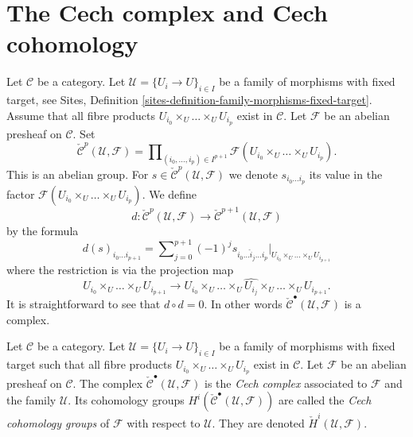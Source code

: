 \section{The Cech complex and Cech cohomology}
\label{section-cech}

\noindent
Let $\mathcal{C}$ be a category. Let $\mathcal{U} = \{U_i \to U\}_{i \in I}$
be a family of morphisms with fixed target, see
Sites, Definition \ref{sites-definition-family-morphisms-fixed-target}.
Assume that all fibre products $U_{i_0} \times_U \ldots \times_U U_{i_p}$
exist in $\mathcal{C}$. Let $\mathcal{F}$ be an abelian presheaf on
$\mathcal{C}$. Set
$$
\check{\mathcal{C}}^p(\mathcal{U}, \mathcal{F})
=
\prod\nolimits_{(i_0, \ldots, i_p) \in I^{p + 1}}
\mathcal{F}(U_{i_0} \times_U \ldots \times_U U_{i_p}).
$$
This is an abelian group. For
$s \in \check{\mathcal{C}}^p(\mathcal{U}, \mathcal{F})$ we denote
$s_{i_0\ldots i_p}$ its value in the factor
$\mathcal{F}(U_{i_0} \times_U \ldots \times_U U_{i_p})$.
We define
$$
d : \check{\mathcal{C}}^p(\mathcal{U}, \mathcal{F})
\longrightarrow
\check{\mathcal{C}}^{p + 1}(\mathcal{U}, \mathcal{F})
$$
by the formula
\begin{equation}
\label{equation-d-cech}
d(s)_{i_0\ldots i_{p + 1}} =
\sum\nolimits_{j = 0}^{p + 1}
(-1)^j s_{i_0\ldots \hat i_j \ldots i_p}
|_{U_{i_0} \times_U \ldots \times_U U_{i_{p + 1}}}
\end{equation}
where the restriction is via the projection map
$$
U_{i_0} \times_U \ldots \times_U U_{i_{p + 1}} \longrightarrow
U_{i_0} \times_U \ldots \times_U \widehat{U_{i_j}} \times_U
\ldots \times_U U_{i_{p + 1}}.
$$
It is straightforward to see that $d \circ d = 0$. In other words
$\check{\mathcal{C}}^\bullet(\mathcal{U}, \mathcal{F})$ is a complex.

\begin{definition}
\label{definition-cech-complex}
Let $\mathcal{C}$ be a category. Let $\mathcal{U} = \{U_i \to U\}_{i \in I}$
be a family of morphisms with fixed target such that all fibre products
$U_{i_0} \times_U \ldots \times_U U_{i_p}$ exist in $\mathcal{C}$.
Let $\mathcal{F}$ be an abelian presheaf on $\mathcal{C}$.
The complex $\check{\mathcal{C}}^\bullet(\mathcal{U}, \mathcal{F})$
is the {\it Cech complex} associated to $\mathcal{F}$ and the
family $\mathcal{U}$. Its cohomology groups
$H^i(\check{\mathcal{C}}^\bullet(\mathcal{U}, \mathcal{F}))$ are
called the {\it Cech cohomology groups} of $\mathcal{F}$ with respect
to $\mathcal{U}$. They are denoted $\check H^i(\mathcal{U}, \mathcal{F})$.
\end{definition}

